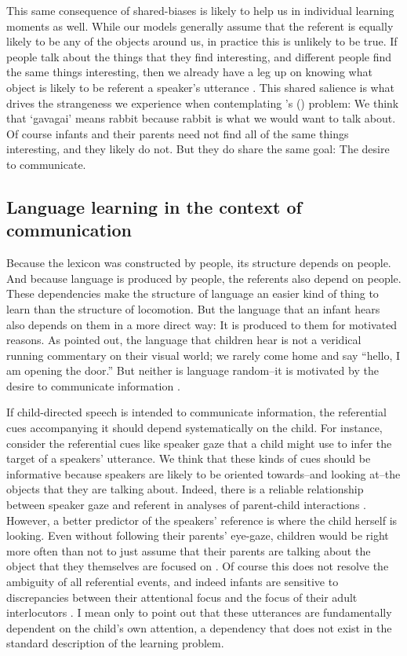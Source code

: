 \documentclass[review]{elsarticle}
\begin{document}
This same consequence of shared-biases is likely to help us in individual learning moments as well. While our models generally assume that the referent is equally likely to be any of the objects around us, in practice this is unlikely to be true. If people talk about the things that they find interesting, and different people find the same things interesting, then we already have a leg up on knowing what object is likely to be referent a speaker's utterance \citep{frank2012,frank2014}.  This shared salience is what drives the strangeness we experience when contemplating \citeauthor{quine1960}'s (\citeyear{quine1960}) problem: We think that `gavagai' means rabbit because rabbit is what we would want to talk about. Of course infants and their parents need not find all of the same things interesting, and they likely do not. But they do share the same goal: The desire to communicate.

\subsection{Language learning in the context of communication}

Because the lexicon was constructed by people, its structure depends on people. And because language is produced by people, the referents also depend on people. These dependencies make the structure of language an easier kind of thing to learn than the structure of locomotion. But the language that an infant hears also depends on them in a more direct way: It is produced to them for motivated reasons. As \cite{gleitman1990} pointed out, the language that children hear is not a veridical running commentary on their visual world; we rarely come home and say ``hello, I am opening the door.'' But neither is language random--it is motivated by the desire to communicate information \citep{grice1969}.

If child-directed speech is intended to communicate information, the referential cues accompanying it should depend systematically on the child. For instance, consider the referential cues like speaker gaze that a child might use to infer the target of a speakers' utterance. We think that these kinds of cues should be informative because speakers are likely to be oriented towards--and looking at--the objects that they are talking about. Indeed, there is a reliable relationship between speaker gaze and referent in analyses of parent-child interactions \citep{frank2013,yu2012embodied}. However, a better predictor of the speakers' reference is where the child herself is looking. Even without following their parents' eye-gaze, children would be right more often than not to just assume that their parents are talking about the object that they themselves are focused on \citep{tomasello1986}. Of course this does not resolve the ambiguity of all referential events, and indeed infants are sensitive to discrepancies between their attentional focus and the focus of their adult interlocutors \citep{baldwin1993}. I mean only to point out that these utterances are fundamentally dependent on the child's own attention, a dependency that does not exist in the standard description of the learning problem.
\end{document}
